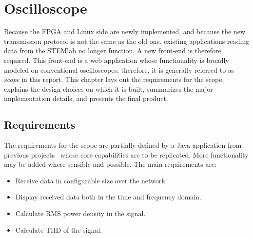 %
%
\chapter{Oscilloscope} %
\label{ch:graphical_front_end}

Because the  FPGA and Linux  side are newly  implemented, and because  the new
transmission protocol  is not the same  as the old one,  existing applications
reading data from the STEMlab no longer function. A new front-end is therefore
required. This front-end is  a web application whose  functionality is broadly
modeled on conventional oscilloscopes; therefore, it is generally referred to
as \emph{scope} in this report. This chapter lays out the requirements for the
scope, explains the design choices on  which it is built, summarizes the major
implementation details, and presents the final product.

%
%
\section{Requirements} %
\label{sec:gui:requirements}

The requirements  for the scope  are partially  defined by a  Java application
from  previous projects~\cite{gut:specky}  whose core  capabilities are  to be
replicated. More functionality  may be added where  sensible and possible. The
main requirements are:
\begin{itemize}\tightlist
    \item Receive data in configurable size over the network.
    \item Display received data both in the time and frequency domain.
    \item Calculate RMS power density in the signal.
    \item Calculate THD of the signal.
\end{itemize}
%
%
